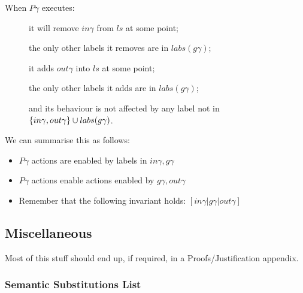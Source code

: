 When $P\gamma$ executes:
\begin{description}
  \item[]
    it will remove $in\gamma$ from $ls$ at some point;
  \item[]
    the only other labels it removes are in $labs(g\gamma)$;
  \item[]
    it adds $out\gamma$ into $ls$ at some point;
  \item[]
    the only other labels it adds are in $labs(g\gamma)$;
  \item[]
    and its behaviour is not affected by any label not
    in
    \\$\{in\gamma,out\gamma\} \cup labs(g\gamma)$.
\end{description}
We can summarise this as follows:
\begin{itemize}
  \item $P\gamma$ actions are enabled by labels in $in\gamma,g\gamma$
  \item $P\gamma$ actions enable actions enabled by $g\gamma,out\gamma$
  \item Remember that the following invariant holds: $[in\gamma|g\gamma|out\gamma]$
\end{itemize}




\newpage
\subsection{Miscellaneous}

Most of this stuff should end up,
if required,
in a Proofs/Justification appendix.

\subsubsection{Semantic Substitutions List}

